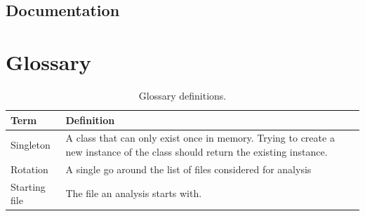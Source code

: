 \documentclass[11pt]{article} %
\begin{document}
    \subsection{Documentation}\label{sec:3.4}


    \newpage



    \section{Glossary}

    \begin{table}[H]
        \centering
        \begin{tabular}{p{.3\linewidth} | p{.6\linewidth}}
            \textbf{Term} & \textbf{Definition}
            \\\hline
            Singleton & A class that can only exist once in memory. Trying to create a new instance of the class
            should return the existing instance. \\\hline
            Rotation & A single go around the list of files considered for analysis \\\hline
            Starting file & The file an analysis starts with.
        \end{tabular}
        \caption{Glossary definitions.}
        \label{tab:glossary}
    \end{table}
    \printbibliography[heading=bibintoc]
    \listoffigures
    \listoftables
\end{document}
